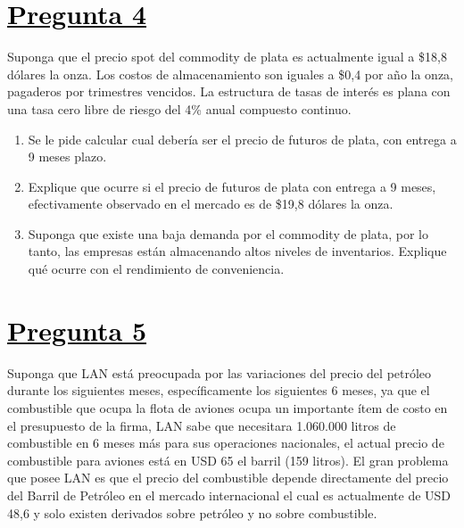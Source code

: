 \documentclass[12pt]{article}
\newcommand{\subrayadoRojo}[1]{{\color{rojoudp}\underline{\textcolor{black}{#1}}}}
\begin{document}
\section*{\subrayadoRojo{Pregunta 4}}
Suponga que el precio spot del commodity de plata es actualmente igual a \$18,8 dólares  
la onza. Los costos de almacenamiento son iguales a \$0,4 por año la onza, pagaderos por
trimestres vencidos. La estructura de tasas de interés es plana con una tasa cero libre 
de riesgo del 4\% anual compuesto continuo.
\begin{enumerate}[label=\textbf{\alph*)}]
    \item   Se le pide calcular cual debería ser el precio de futuros de plata, con entrega a 9 meses plazo.
    \item 	Explique que ocurre si el precio de futuros de plata con entrega a 9 meses,
    efectivamente observado en el mercado es de \$19,8 dólares la onza.
    \item Suponga que existe una baja demanda por el commodity de plata, por lo tanto,
    las empresas están almacenando altos niveles de inventarios. 
    Explique qué ocurre con el rendimiento de conveniencia.
    
\end{enumerate}

\vspace{1em}
\section*{\subrayadoRojo{Pregunta 5}}
    Suponga que LAN está preocupada por las variaciones del precio del petróleo durante los siguientes meses,
    específicamente los siguientes 6 meses, ya que el combustible que ocupa la flota de aviones ocupa un importante 
    ítem de costo en el presupuesto de la firma, LAN sabe que necesitara 1.060.000 litros de combustible en 6 meses
    más para sus operaciones nacionales, el actual precio de combustible para aviones está en USD 65 el barril (159 litros). 
    El gran problema que posee LAN es que el precio del combustible depende directamente del precio del Barril de Petróleo 
    en el mercado internacional el cual es actualmente de USD 48,6 y solo existen derivados sobre petróleo y no sobre combustible.
\end{document}

